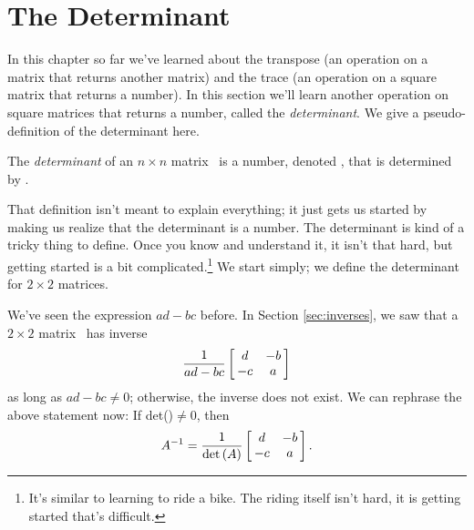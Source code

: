 \section{The Determinant}\label{sec:determinant_1}


In this chapter so far we've learned about the transpose (an operation on a matrix that returns another matrix) and the trace (an operation on a square matrix that returns a number). In this section we'll learn another operation on square matrices that returns a number, called the \textit{determinant}. 
We give a pseudo-definition of the determinant here.
\begin{center}
\parbox{240pt}{The \textit{determinant} of an $n\times n$ matrix \tta\ is a number, denoted \det{\tta}, that is determined by \tta.}
\end{center}

That definition isn't meant to explain everything; it just gets us started by making us realize that the determinant is a number. The determinant is kind of a tricky thing to define. Once you know and understand it, it isn't that hard, but getting started is a bit complicated.\footnote{It's similar to learning to ride a bike. The riding itself isn't hard, it is getting started that's difficult.} We start simply; we define the determinant for $2 \times 2$ matrices.

We've seen the expression $ad-bc$ before. In Section \ref{sec:inverses}, we saw that a $2\times2$ matrix \tta\ has inverse $$\frac{1}{ad-bc}\bmx{cc}d&-b\\-c&a\emx$$ as long as $ad-bc\neq 0$; otherwise, the inverse does not exist. We can rephrase the above statement now: If det(\tta)$\neq 0$, then $$\ttai = \frac{1}{\det{\tta}}\bmx{cc}d&-b\\-c&a\emx.$$

